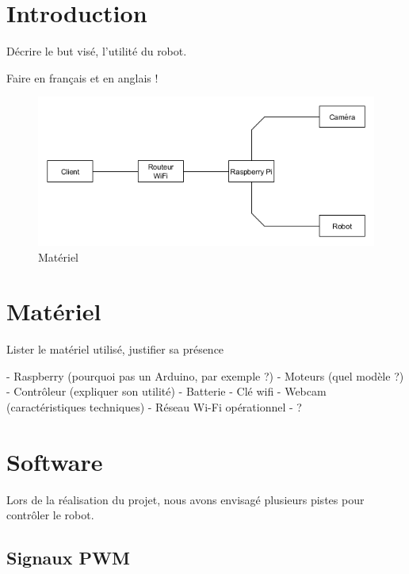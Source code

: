 \documentclass[12pt,a4paper]{report}
\begin{document}
\umonsCoverPage

\tableofcontents

\chapter{Introduction}

Décrire le but visé, l'utilité du robot.

Faire en français et en anglais !

\begin{figure}[hf!]
\center
\includegraphics[scale=0.6]{GraphMateriel.png}
\caption{Matériel}
\end{figure}

\chapter{Matériel}

Lister le matériel utilisé, justifier sa présence

- Raspberry (pourquoi pas un Arduino, par exemple ?)
- Moteurs (quel modèle ?)
- Contrôleur (expliquer son utilité)
- Batterie
- Clé wifi
- Webcam (caractéristiques techniques)
- Réseau Wi-Fi opérationnel
- ?

\chapter{Software}




Lors de la réalisation du projet, nous avons envisagé plusieurs pistes pour contrôler le robot. 

\section{Signaux PWM}
\end{document}
